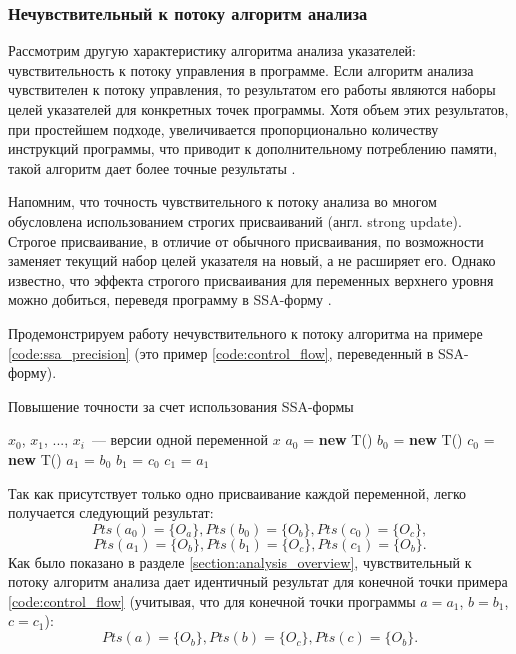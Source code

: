 \documentclass[14pt,titlepage]{extarticle}
\newcommand{\NEW}{\textbf{new }}
\newcommand{\eng}[1]{{\English#1}}
\begin{document}
    \subsubsection{Нечувствительный к потоку алгоритм анализа}
      \label{section:flow_sensetive_analysis}

      Рассмотрим другую характеристику алгоритма анализа указателей:
      чувствительность к потоку управления в программе.
      Если алгоритм анализа чувствителен к потоку управления, то результатом
      его работы являются наборы целей указателей для конкретных точек
      программы.
      Хотя объем этих результатов, при простейшем подходе, увеличивается
      пропорционально количеству инструкций программы, что приводит к
      дополнительному потреблению памяти, такой алгоритм дает более точные
      результаты \cite[с.~57]{hind_pointer_analysis_not_solved_yet}.

      Напомним, что точность чувствительного к потоку анализа во многом
      обусловлена использованием строгих присваиваний (англ. \eng{strong
      update}).
      Строгое присваивание, в отличие от обычного присваивания, по возможности
      заменяет текущий набор целей указателя на новый, а не расширяет его.
      Однако известно, что эффекта строгого присваивания для переменных
      верхнего уровня можно добиться, переведя программу в SSA-форму
      \cite{points_to_with_efficient_strong_updates}.

      Продемонстрируем работу нечувствительного к потоку алгоритма на примере
      \ref{code:ssa_precision} (это пример \ref{code:control_flow},
      переведенный в SSA-форму).
      \begin{algorithm}
        \caption{Повышение точности за счет использования SSA-формы}
        \label{code:ssa_precision}
        \begin{algorithmic}[1]
          \REQUIRE $x_0$, $x_1$, ..., $x_i$~--- версии одной переменной $x$
          \STATE $a_0$ = \NEW T()
          \STATE $b_0$ = \NEW T()
          \STATE $c_0$ = \NEW T()
          \STATE $a_1$ = $b_0$
          \STATE $b_1$ = $c_0$
          \STATE $c_1$ = $a_1$
        \end{algorithmic}
      \end{algorithm}

      Так как присутствует только одно присваивание каждой переменной, легко
      получается следующий результат:
      \[Pts(a_0) = \{O_a\}, Pts(b_0) = \{O_b\}, Pts(c_0) = \{O_c\},\]
      \[Pts(a_1) = \{O_b\}, Pts(b_1) = \{O_c\}, Pts(c_1) = \{O_b\}.\]
      Как было показано в разделе \ref{section:analysis_overview},
      чувствительный к
      потоку алгоритм анализа дает идентичный результат для конечной точки
      примера \ref{code:control_flow} (учитывая, что для конечной точки
      программы $a = a_1$, $b = b_1$, $c = c_1$):
      \[Pts(a) = \{O_b\}, Pts(b) = \{O_c\}, Pts(c) = \{O_b\}.\]
\end{document}
